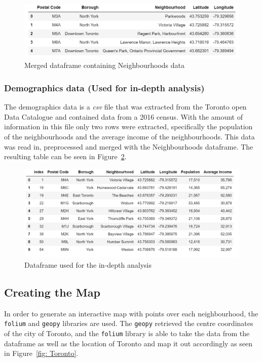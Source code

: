 \documentclass[12pt, conference]{IEEEtran}
\def\code#1{\texttt{#1}}
\begin{document}
\begin{figure}[!h]
\center
\includegraphics[scale=0.8]{Finaldf}
\caption{Merged dataframe containing Neighbourhoods data}
\label{fig: Finaldf}
\end{figure}

\subsubsection{Demographics data (Used for in-depth analysis)}
The demographics data is a \textit{csv} file that was extracted from the Toronto open Data Catalogue and contained data from a 2016 census. With the amount of information in this file only two rows were extracted, specifically the population of the neighbourhoods and the average income of the neighbourhoods. This data was read in, preprocessed and merged with the Neighbourhoods dataframe. The resulting table can be seen in Figure~\ref{fig: InDepth}.

\begin{figure}[!h]
\center
\includegraphics[scale=0.8]{InDepthTable}
\caption{Dataframe used for the in-depth analysis}
\label{fig: InDepth}
\end{figure}

\subsection{Creating the Map}
In order to generate an interactive map with points over each neighbourhood, the \code{folium} and \code{geopy} libraries are used. The \code{geopy} retrieved the centre coordinates of the city of Toronto, and the \code{folium} library is able to take the data from the dataframe as well as the location of Toronto and map it out accordingly as seen in Figure~\ref{fig: Toronto}.
\end{document}
